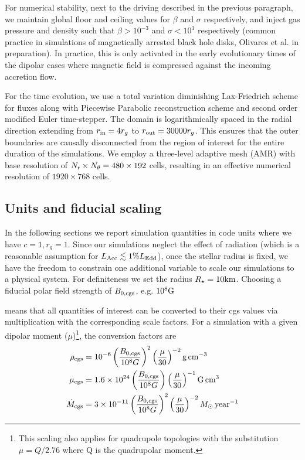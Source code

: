 \documentclass[fleqn,usenatbib]{mnras}
\begin{document}
 For numerical stability, next to the driving described in the previous paragraph, we maintain global floor and ceiling values for $\beta$ and $\sigma$ respectively, and inject gas pressure and density such that $\beta > 10^{-3}$ and $\sigma < 10^3$  respectively (common practice in simulations of magnetically arrested black hole disks, Olivares et al. in preparation). In practice, this is only activated in the early evolutionary times of the dipolar cases where magnetic field is compressed against the incoming accretion flow.  
 
 For the time evolution, we use a total variation diminishing Lax-Friedrich scheme for fluxes along with Piecewise Parabolic reconstruction scheme and second order modified Euler time-stepper. The domain is logarithmically spaced in the radial direction extending from $r_{\rm in} = 4r_g$ to $r_{\rm out} = 30000r_g$.  This ensures that the outer boundaries are causally disconnected from the region of interest for the entire duration of the simulations.  
 We employ a three-level adaptive mesh (AMR) with base resolution of $N_{\rm r} \times N_{\theta} = 480\times192$ cells, resulting in an effective numerical resolution of $1920 \times 768$ cells.  

\subsection{Units and fiducial scaling}\label{subsec:units}
In the following sections we report simulation quantities in code units where we have $c=1, r_g=1$.  
Since our simulations neglect the effect of radiation (which is a reasonable assumption for $L_{\rm Acc}\lesssim 1\% L_{\rm Edd}$), once the stellar radius is fixed,
we have the freedom to constrain one additional variable to scale our simulations to a physical system.  For definiteness we set the radius  $R_\star=10\rm km$.  
Choosing a fiducial polar field strength of $B_{0,\rm cgs}$, e.g. $10^8\rm G$ \

means that all quantities of interest can be converted to their cgs values via multiplication with the corresponding scale factors.  For a simulation with a given dipolar moment ($\mu$)\footnote{This scaling also applies for quadrupole topologies with the substitution $\mu=Q/2.76$ where Q is the quadrupolar moment.}, the conversion factors are
\begin{align}
    \rho_{\rm cgs} &= 10^{-6} \left(\frac{B_{0,\rm cgs}}{10^8 G}\right)^2 \left(\frac{\mu}{30}\right)^{-2}\rm g\, cm^{-3} \\
    \mu_{\rm cgs} &= 1.6\times 10^{24} \left(\frac{B_{0,\rm cgs}}{10^8 G}\right) \left(\frac{\mu}{30}\right)^{-1}\rm G\, cm^3 \\
    \dot{M}_{\rm cgs} & = 3\times 10^{-11} \left(\frac{B_{0,\rm cgs}}{10^8 G}\right)^2 \left(\frac{\mu}{30}\right)^{-2} M_{\odot}\, \rm year^{-1}
\end{align}
\end{document}
